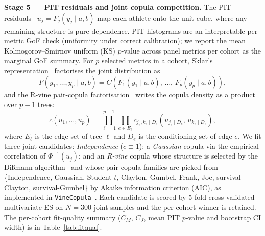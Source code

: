\documentclass[10pt]{article}
\begin{document}
\textbf{Stage 5 --- PIT residuals and joint copula competition.}
The PIT residuals~\cite{dawid1984pit}
$u_j = F_j(y_j \mid a, b)$ map each athlete onto the unit cube,
where any remaining structure is pure dependence. PIT histograms are
an interpretable per-metric GoF check (uniformity under correct
calibration); we report the mean Kolmogorov--Smirnov uniform (KS)
$p$-value across panel metrics per cohort as the marginal GoF summary.
For $p$ selected metrics in a cohort, Sklar's
representation~\cite{sklar1959fonctions} factorises the joint
distribution as
\begin{equation}
F(y_1, \dots, y_p \mid a, b) =
C\!\left(F_1(y_1 \mid a, b),\, \dots,\, F_p(y_p \mid a, b)\right),
\label{eq:sklar}
\end{equation}
and the R-vine pair-copula factorisation~\cite{aas2009pair} writes
the copula density as a product over $p\!-\!1$ trees:
\begin{equation}
c(u_1, \dots, u_p) =
\prod_{\ell=1}^{p-1} \prod_{e \in E_\ell}
c_{j_e, k_e \mid D_e}\!\left(u_{j_e \mid D_e},\, u_{k_e \mid D_e}\right),
\label{eq:vine}
\end{equation}
where $E_\ell$ is the edge set of tree $\ell$ and $D_e$ is the
conditioning set of edge $e$. We fit three joint candidates:
\emph{Independence} ($c \equiv 1$); a \emph{Gaussian} copula via the
empirical correlation of $\Phi^{-1}(u_j)$; and an \emph{R-vine} copula
whose structure is selected by the Di{\ss}mann
algorithm~\cite{dissmann2013selecting} and whose pair-copula families
are picked from \{Independence, Gaussian, Student-$t$, Clayton,
Gumbel, Frank, Joe, survival-Clayton, survival-Gumbel\} by Akaike
information criterion (AIC), as implemented in
\texttt{VineCopula}~\cite{nagler2022vinecopula}. Each candidate is
scored by 5-fold cross-validated multivariate ES
\cite{gneiting2008assessing, gneiting2014probabilistic} on $N{=}300$
joint samples and the per-cohort winner is retained. The per-cohort
fit-quality summary ($C_M$, $C_J$, mean PIT $p$-value and bootstrap
CI width) is in Table~\ref{tab:fitqual}.
\end{document}

